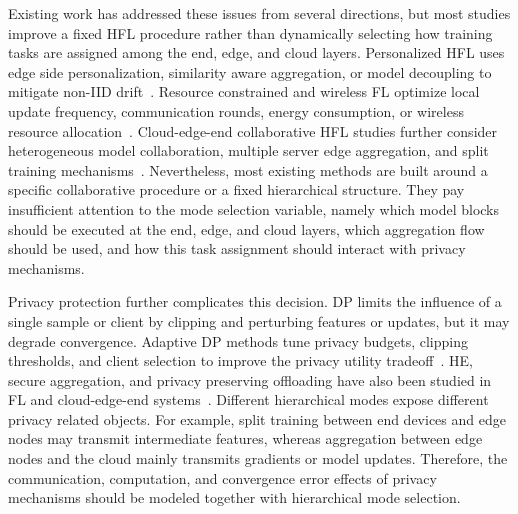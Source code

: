 ﻿\documentclass[preprint,12pt]{elsarticle}
\theoremstyle{plain}
\theoremstyle{definition}
\theoremstyle{remark}
\begin{document}
Existing work has addressed these issues from several directions, but most studies improve a fixed HFL procedure rather than dynamically selecting how training tasks are assigned among the end, edge, and cloud layers.
Personalized HFL uses edge side personalization, similarity aware aggregation, or model decoupling to mitigate non-IID drift~\cite{Personalizedhfl,JSJX202502007}.
Resource constrained and wireless FL optimize local update frequency, communication rounds, energy consumption, or wireless resource allocation~\cite{wang2019adaptivefl,dinh2021wirelessfl}.
Cloud-edge-end collaborative HFL studies further consider heterogeneous model collaboration, multiple server edge aggregation, and split training mechanisms~\cite{BSBODP,mazloomi2025multiserver,SFETEC}.
Nevertheless, most existing methods are built around a specific collaborative procedure or a fixed hierarchical structure.
They pay insufficient attention to the mode selection variable, namely which model blocks should be executed at the end, edge, and cloud layers, which aggregation flow should be used, and how this task assignment should interact with privacy mechanisms.

Privacy protection further complicates this decision.
DP limits the influence of a single sample or client by clipping and perturbing features or updates, but it may degrade convergence.
Adaptive DP methods tune privacy budgets, clipping thresholds, and client selection to improve the privacy utility tradeoff~\cite{GLDP,xu2025adpfl,elabd2025dynamicdp}.
HE, secure aggregation, and privacy preserving offloading have also been studied in FL and cloud-edge-end systems~\cite{dong2026privacyoffloading,PPHFL,islam2025pphffl}.
Different hierarchical modes expose different privacy related objects.
For example, split training between end devices and edge nodes may transmit intermediate features, whereas aggregation between edge nodes and the cloud mainly transmits gradients or model updates.
Therefore, the communication, computation, and convergence error effects of privacy mechanisms should be modeled together with hierarchical mode selection.
\end{document}
